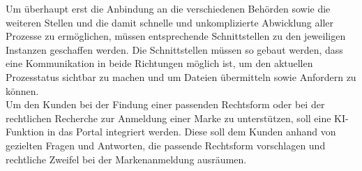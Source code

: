 Um überhaupt erst die Anbindung an die verschiedenen Behörden sowie die weiteren Stellen und die damit schnelle und unkomplizierte Abwicklung aller Prozesse zu ermöglichen, müssen entsprechende Schnittstellen zu den jeweiligen Instanzen geschaffen werden. Die Schnittstellen müssen so gebaut werden, dass eine Kommunikation in beide Richtungen möglich ist, um den aktuellen Prozesstatus sichtbar zu machen und um Dateien übermitteln sowie Anfordern zu können.\\
Um den Kunden bei der Findung einer passenden Rechtsform oder bei der rechtlichen Recherche zur Anmeldung einer Marke zu unterstützen, soll eine KI-Funktion in das Portal integriert werden. Diese soll dem Kunden anhand von gezielten Fragen und Antworten, die passende Rechtsform vorschlagen und rechtliche Zweifel bei der Markenanmeldung ausräumen.\\